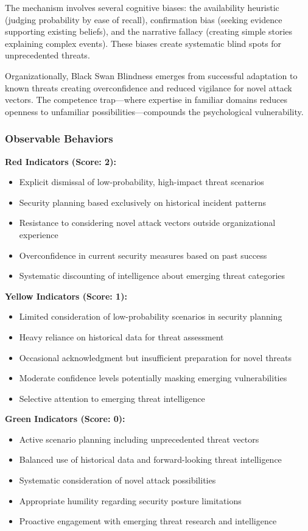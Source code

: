 \documentclass[11pt,a4paper]{article}
\begin{document}
The mechanism involves several cognitive biases: the availability heuristic (judging probability by ease of recall), confirmation bias (seeking evidence supporting existing beliefs), and the narrative fallacy (creating simple stories explaining complex events). These biases create systematic blind spots for unprecedented threats.

Organizationally, Black Swan Blindness emerges from successful adaptation to known threats creating overconfidence and reduced vigilance for novel attack vectors. The competence trap—where expertise in familiar domains reduces openness to unfamiliar possibilities—compounds the psychological vulnerability.

\subsubsection{Observable Behaviors}

\textbf{Red Indicators (Score: 2):}
\begin{itemize}
\item Explicit dismissal of low-probability, high-impact threat scenarios
\item Security planning based exclusively on historical incident patterns
\item Resistance to considering novel attack vectors outside organizational experience
\item Overconfidence in current security measures based on past success
\item Systematic discounting of intelligence about emerging threat categories
\end{itemize}

\textbf{Yellow Indicators (Score: 1):}
\begin{itemize}
\item Limited consideration of low-probability scenarios in security planning
\item Heavy reliance on historical data for threat assessment
\item Occasional acknowledgment but insufficient preparation for novel threats
\item Moderate confidence levels potentially masking emerging vulnerabilities
\item Selective attention to emerging threat intelligence
\end{itemize}

\textbf{Green Indicators (Score: 0):}
\begin{itemize}
\item Active scenario planning including unprecedented threat vectors
\item Balanced use of historical data and forward-looking threat intelligence
\item Systematic consideration of novel attack possibilities
\item Appropriate humility regarding security posture limitations
\item Proactive engagement with emerging threat research and intelligence
\end{itemize}
\end{document}

